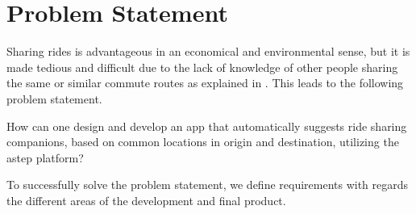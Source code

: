 \section{Problem Statement}\label{sec:probstat}
Sharing rides is advantageous in an economical and environmental sense, but it is made tedious and difficult due to the lack of knowledge of other people sharing the same or similar commute routes as explained in \cite{doi:10.1080/01441647.2011.621557}. This leads to the following problem statement.

{\addtolength{\leftskip}{10mm}\addtolength{\rightskip}{10mm}\noindent\hrulefill\it

\noindent How can one design and develop an app that automatically suggests ride sharing companions, based on common locations in origin and destination, utilizing the \gls{astep} platform? 

\noindent\hrulefill

}

To successfully solve the problem statement, we  define requirements with regards the different areas of the development and final product.
